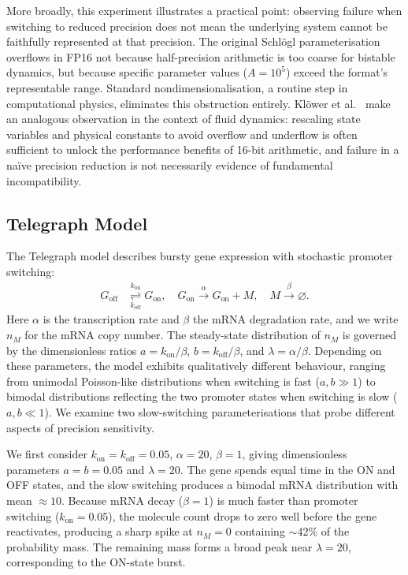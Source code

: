 \documentclass{article}
\begin{document}
More broadly, this experiment illustrates a practical point: observing failure when switching to reduced precision does not mean the underlying system cannot be faithfully represented at that precision. The original Schl\"{o}gl parameterisation overflows in FP16 not because half-precision arithmetic is too coarse for bistable dynamics, but because specific parameter values ($A = 10^5$) exceed the format's representable range. Standard nondimensionalisation, a routine step in computational physics, eliminates this obstruction entirely. Kl\"{o}wer et al.~\cite{Klower2022} make an analogous observation in the context of fluid dynamics: rescaling state variables and physical constants to avoid overflow and underflow is often sufficient to unlock the performance benefits of 16-bit arithmetic, and failure in a na\"{i}ve precision reduction is not necessarily evidence of fundamental incompatibility.

\subsection{Telegraph Model}

The Telegraph model \cite{peccoud1995} describes bursty gene expression with stochastic promoter switching:
\begin{align*}
    G_{\text{off}} &\underset{k_{\mathrm{off}}}{\overset{k_{\mathrm{on}}}{\rightleftharpoons}} G_{\text{on}}, \quad G_{\text{on}} \xrightarrow{\alpha} G_{\text{on}} + M, \quad M \xrightarrow{\beta} \varnothing.
\end{align*}
Here $\alpha$ is the transcription rate and $\beta$ the mRNA degradation rate, and we write $n_M$ for the mRNA copy number. The steady-state distribution of $n_M$ is governed by the dimensionless ratios $a = k_{\mathrm{on}}/\beta$, $b = k_{\mathrm{off}}/\beta$, and $\lambda = \alpha/\beta$. Depending on these parameters, the model exhibits qualitatively different behaviour, ranging from unimodal Poisson-like distributions when switching is fast ($a, b \gg 1$) to bimodal distributions reflecting the two promoter states when switching is slow ($a, b \ll 1$). We examine two slow-switching parameterisations that probe different aspects of precision sensitivity.

We first consider $k_{\mathrm{on}} = k_{\mathrm{off}} = 0.05$, $\alpha = 20$, $\beta = 1$, giving dimensionless parameters $a = b = 0.05$ and $\lambda = 20$. The gene spends equal time in the ON and OFF states, and the slow switching produces a bimodal mRNA distribution with mean $\approx 10$. Because mRNA decay ($\beta = 1$) is much faster than promoter switching ($k_{\mathrm{on}} = 0.05$), the molecule count drops to zero well before the gene reactivates, producing a sharp spike at $n_M = 0$ containing $\sim$42\% of the probability mass. The remaining mass forms a broad peak near $\lambda = 20$, corresponding to the ON-state burst.
\end{document}
